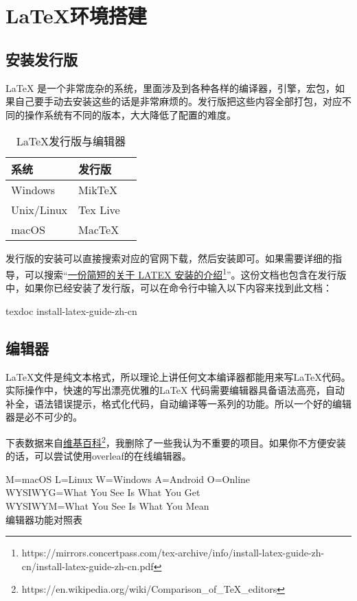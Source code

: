 \chapter{\LaTeX 环境搭建}
\section{安装发行版}
\LaTeX
是一个非常庞杂的系统，里面涉及到各种各样的编译器，引擎，宏包，如果自己要手动去安装这些的话是非常麻烦的。发行版把这些内容全部打包，对应不同的操作系统有不同的版本，大大降低了配置的难度。
\begin{table}[htpb]
	\centering
	\begin{tabular}{ lll } \toprule
		系统       & 发行版   \\          \midrule
		Windows    & MikTeX   \\
		Unix/Linux & Tex Live \\
		macOS      & MacTeX   \\\bottomrule
	\end{tabular}
	\caption{\LaTeX 发行版与编辑器}
\end{table}

发行版的安装可以直接搜索对应的官网下载，然后安装即可。如果需要详细的指导，可以搜索``\href{https://mirrors.concertpass.com/tex-archive/info/install-latex-guide-zh-cn/install-latex-guide-zh-cn.pdf}{一份简短的关于 LATEX
	安装的介绍}\footnote{https://mirrors.concertpass.com/tex-archive/info/install-latex-guide-zh-cn/install-latex-guide-zh-cn.pdf}''。这份文档也包含在发行版中，如果你已经安装了发行版，可以在命令行中输入以下内容来找到此文档：
\begin{shellcmd}
	texdoc install-latex-guide-zh-cn
\end{shellcmd}

\section{编辑器}
\LaTeX 文件是纯文本格式，所以理论上讲任何文本编译器都能用来写\LaTeX 代码。实际操作中，快速的写出漂亮优雅的\LaTeX
代码需要编辑器具备语法高亮，自动补全，语法错误提示，格式化代码，自动编译等一系列的功能。所以一个好的编辑器是必不可少的。

下表数据来自\href{https://en.wikipedia.org/wiki/Comparison_of_TeX_editors}{维基百科}\footnote{https://en.wikipedia.org/wiki/Comparison\_of\_TeX\_editors}，我删除了一些我认为不重要的项目。如果你不方便安装的话，可以尝试使用overleaf的在线编辑器。

\begin{table}[thpb]
	\centering

	M=macOS L=Linux W=Windows A=Android O=Online \\
	WYSIWYG=What You See Is What You Get         \\
	WYSIWYM=What You See Is What You Mean        \\
	\caption{编辑器功能对照表}
\end{table}

